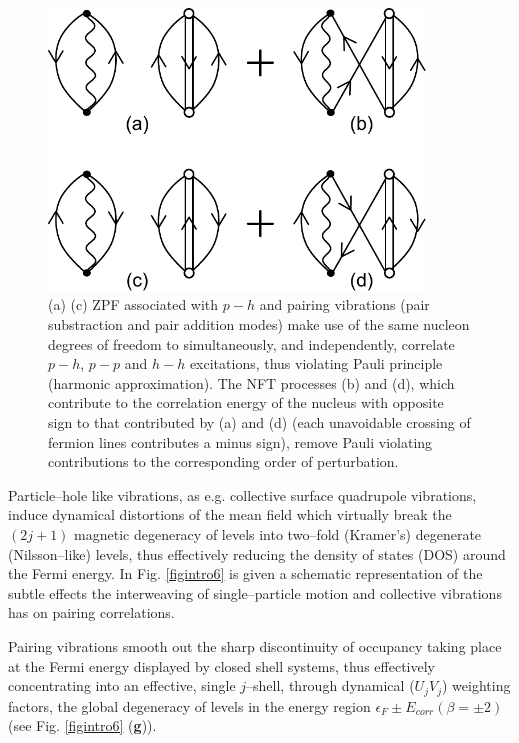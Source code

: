 \begin{figure}
\centerline {
\includegraphics*[width=10cm]{introduccion/figs/figintroF2}
}
\caption{(a) (c) ZPF associated with $p-h$ and pairing vibrations (pair substraction and pair addition modes) make use of the same nucleon degrees of freedom to simultaneously, and independently, correlate  $p-h$, $p-p$ and $h-h$ excitations, thus violating Pauli principle (harmonic approximation). The NFT processes (b) and (d), which contribute to the correlation energy of the nucleus with opposite sign to that contributed by (a) and (d) (each unavoidable crossing of fermion lines contributes  a minus sign), remove Pauli violating contributions to the corresponding order of perturbation.}
\label{figintroF2}
\end{figure}
Particle--hole like vibrations, as e.g. collective surface quadrupole vibrations, induce dynamical distortions of the mean field which virtually break the $(2j+1)$ magnetic degeneracy of levels into two--fold (Kramer's) degenerate (Nilsson--like) levels, thus effectively reducing the density of states (DOS) around the Fermi energy. In Fig. \ref{figintro6} is given a schematic representation of the subtle effects the interweaving of single--particle motion and collective vibrations has on pairing correlations. 


Pairing vibrations smooth out the sharp discontinuity of occupancy taking place at the Fermi energy  displayed by closed shell systems, thus effectively concentrating into an effective, single $j$--shell, through dynamical ($U_jV_j$) weighting factors, the global degeneracy of levels in the energy region $\epsilon_F\pm E_{corr}(\beta=\pm2)$ (see Fig. \ref{figintro6} (\textbf{g})).


